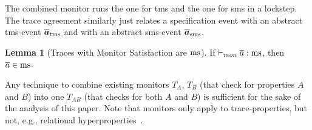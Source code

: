 \documentclass[dvipsnames,conference]{IEEEtran}
\theoremstyle{definition}
\newtheorem{lemma}{Lemma}[section]
\begin{document}
\begin{center}
  $\;$\\
\end{center}
The combined monitor runs the one for \gls*{tms} and the one for \gls*{sms} in a lockstep. The trace agreement similarly just relates a specification event with an abstract \gls*{tms}-event $\abstrace[_{\tmssafe}]$ and with an abstract \gls*{sms}-event $\abstrace[_{\smssafe}]$.

\begin{lemma}[Traces with Monitor Satisfaction are $\mssafe$]\label{lem:mon:msafe}
  If $\monmssafe{\trace}$, then $\trace\in\mssafe$.\Coqed
\end{lemma}

Any technique to combine existing monitors $T_A$, $T_B$ (that check for properties $A$ and $B$) into one $T_{AB}$ (that checks for both $A$ and $B$) is sufficient for the sake of the analysis of this paper.
Note that monitors only apply to trace-properties, but not, e.g., relational hyperproperties~\cite{abate2019jour}.
\end{document}
